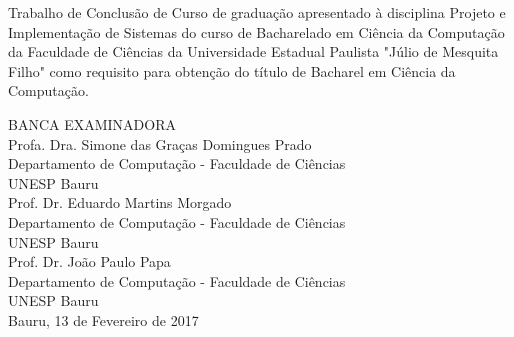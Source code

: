 \documentclass[
	12pt,					%
	openright,				%
	oneside,				%
	a4paper,				%
	bibjustif,				%
	chapter=TITLE,			%
	english,				%
	brazil,					%
	]{abntex2}
\begin{document}
\newpage %
\thispagestyle{empty} %
\begin{center}
\makeatletter
	\textbf{\@author}

	\vspace{3.0cm} %
	\textbf{\large \@title}
\makeatother
\end{center}

\begin{adjustwidth}{7cm}{0cm}
	\vspace{1.5cm}
	Trabalho de Conclusão de Curso de graduação apresentado à disciplina Projeto e Implementação de Sistemas do curso de Bacharelado em Ciência da Computação da Faculdade de Ciências da Universidade Estadual Paulista "Júlio de Mesquita Filho"{} como requisito para obtenção do título de Bacharel em Ciência da Computação.
\end{adjustwidth}

\begin{center}
	\vspace{1.0cm}
	BANCA EXAMINADORA\\
	
	\vspace{1.0cm}
	Profa. Dra. Simone das Graças Domingues Prado\\
	Departamento de Computação - Faculdade de Ciências\\
	UNESP Bauru\\
	\vspace{1.0cm}
	Prof. Dr. Eduardo Martins Morgado\\
	Departamento de Computação - Faculdade de Ciências\\
	UNESP Bauru\\
	\vspace{1.0cm}
	Prof. Dr. João Paulo Papa\\
	Departamento de Computação - Faculdade de Ciências\\
	UNESP Bauru\\

	\vspace*{\fill} %
	Bauru, 13 de Fevereiro de 2017
\end{center}
\end{document}
